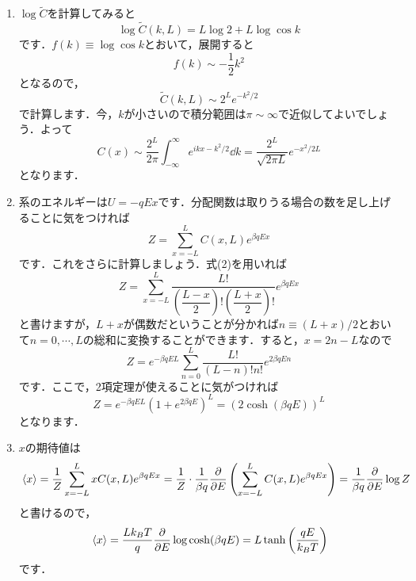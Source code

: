 \documentclass[a4paper,pdflatex,ja=standard]{bxjsarticle}
\begin{document}
\begin{enumerate}
  \item 

  $\log \tilde{C}$を計算してみると
  \begin{equation}
    \log \tilde{C}(k,L)
    =
    L\log 2
    +
    L\log \cos k
  \end{equation}
  です．$f(k)\equiv\log\cos k$とおいて，展開すると
  \begin{equation}
    f(k)
    \sim
    -\frac{1}{2}k^2
  \end{equation}
  となるので，
  \begin{equation}
    \tilde{C}(k,L)
    \sim
    2^L e^{-k^2/2}
  \end{equation}
  で計算します．今，$k$が小さいので積分範囲は$\pi\sim\infty$で近似してよいでしょう．よって
  \begin{equation}
    C(x)
    \sim
    \frac{2^L}{2\pi}
    \int_{-\infty}^{\infty}
    e^{ikx-k^2/2}
    \dd k
    =
    \frac{2^L}{\sqrt{2\pi L}}e^{-x^2/2L}
  \end{equation}
  となります．


  \item 

  系のエネルギーは$U=-qEx$です．分配関数は取りうる場合の数を足し上げることに気をつければ
  \begin{equation}
    Z
    =
    \sum_{x=-L}^{L}
    C(x,L)
    e^{\beta qEx}
  \end{equation}
  です．これをさらに計算しましょう．式(2)を用いれば
  \begin{equation}
    Z
    =
    \sum_{x=-L}^{L}
    \dfrac{L!}{
      \left( \dfrac{L-x}{2} \right)!
      \left( \dfrac{L+x}{2} \right)!
    }
    e^{\beta qEx}
  \end{equation}
  と書けますが，$L+x$が偶数だということが分かれば$n\equiv (L+x)/2$とおいて$n=0,\cdots, L$の総和に変換することができます．すると，$x=2n-L$なので
  \begin{equation}
    Z
    =
    e^{-\beta qEL}
    \sum_{n=0}^{L}
    \dfrac{L!}{(L-n)!n!}
    e^{2\beta qEn}
  \end{equation}
  です．ここで，2項定理が使えることに気がつければ
  \begin{equation}
    Z
    =
    e^{-\beta qEL}
    (1+e^{2\beta qE})^L
    =
    (2\cosh(\beta qE))^L
  \end{equation}
  となります．


  \item 

  $x$の期待値は
  \begin{equation}
    \ev*{x}
    =
    \frac{1}{Z}
    \sum_{x=-L}^{L}
    x
    C(x,L)
    e^{\beta qEx}
    =
    \frac{1}{Z}\cdot\frac{1}{\beta q}
    \pdv{}{E}
    \left(  
      \sum_{x=-L}^{L}
      C(x,L)
      e^{\beta qEx}
    \right)
    =
    \frac{1}{\beta q}
    \pdv{}{E}\log Z
  \end{equation}
  と書けるので，
  \begin{equation}
    \ev*{x}
    =
    \frac{Lk_BT}{q}
    \pdv{}{E}
    \log\cosh(\beta qE)
    =
    L\tanh\left( \frac{qE}{k_BT} \right)
  \end{equation}
  です．



\end{enumerate}
\end{document}
